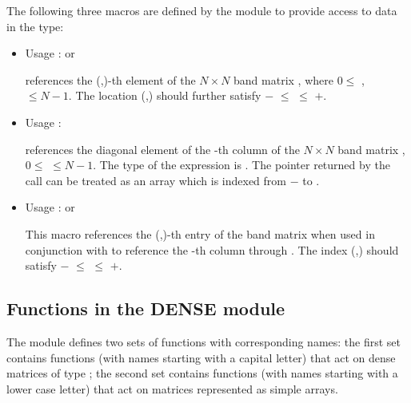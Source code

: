 The following three macros are defined by the {\band} module to provide
access to data in the  type:
\begin{itemize}
\item {}
  \par Usage :  or 
  \par {} references the (,)-th element of the
  $N \times N$ band matrix , where $0 \le$ ,  $\le N-1$.
  The location (,) should further satisfy 
  $-$ $\le$  $\le$ $+$.
\item {}
  \par Usage : 
  \par {} references the diagonal element of the -th
  column of the $N \times N$ band matrix , $0 \le$  $\le N-1$.
  The type of the expression  is . 
  The pointer returned by the call  can be treated as 
  an array which is indexed from $-$ to .
\item {}
  \par Usage :  or
  \par This macro references the (,)-th entry of the band matrix 
  when used in conjunction with  to reference the -th column through
  . The index (,) should satisfy 
  $-$ $\le$  $\le$ $+$.
\end{itemize}



\subsection{Functions in the DENSE module}\label{ss:dense}

The {\dense} module defines two sets of functions with corresponding names:
the first set contains functions (with names starting with a capital letter)
that act on dense matrices of type ; the second set contains functions
(with names starting with a lower case letter) that act on matrices represented 
as simple arrays.

